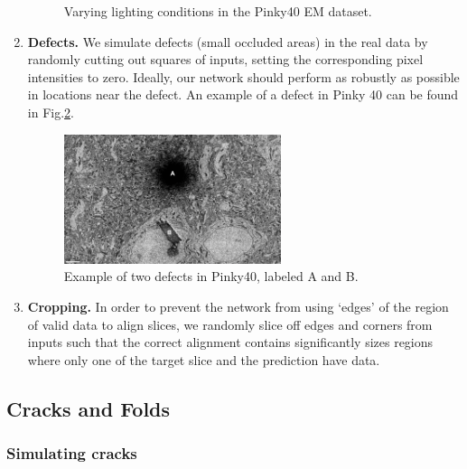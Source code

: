 \documentclass{article}
\begin{document}
\begin{enumerate}
\begin{figure}[!ht]
	\caption[Various lighting conditions in Pinky40]{Varying lighting conditions in the Pinky40 EM dataset.}\label{lighting}
\end{figure}
\item \textbf{Defects.} We simulate defects (small occluded areas) in the real data by randomly cutting out squares of inputs, setting the corresponding pixel intensities to zero. Ideally, our network should perform as robustly as possible in locations near the defect. An example of a defect in Pinky 40 can be found in Fig.\ref{defect}.
\begin{figure}[!ht]
	\centering
	\includegraphics[width=0.6\textwidth]{defects}
	\caption[Example of two defects in Pinky40]{Example of two defects in Pinky40, labeled A and B.}\label{defect}
\end{figure}

\item \textbf{Cropping.} In order to prevent the network from using `edges' of the region of valid data to align slices, we randomly slice off edges and corners from inputs such that the correct alignment contains significantly sizes regions where only one of the target slice and the prediction have data.
\end{enumerate}

\subsection{Cracks and Folds}

\subsubsection{Simulating cracks}
\end{document}
